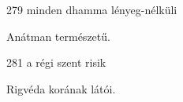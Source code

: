
\begin{notesdescription}

\item[{279}
{minden dhamma lényeg-nélküli}
{}] \hfill\par

Anátman természetű.

\item[{281}
{a régi szent risik}
{}]

Rigvéda korának látói.





\end{notesdescription}

